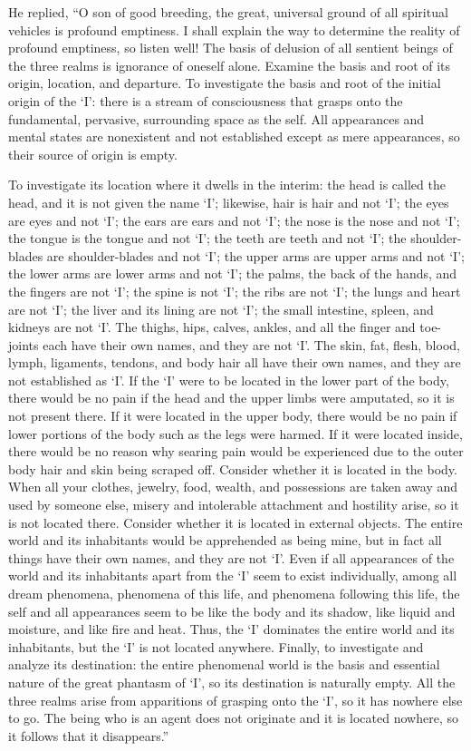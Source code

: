 \documentclass[a4paper,11pt,twoside,final]{book}
\begin{document}
He replied, ``O son of good breeding, the great, universal ground of
all spiritual vehicles is profound emptiness. I shall explain the way
to determine the reality of profound emptiness, so listen well! The
basis of delusion of all sentient beings of the three realms is
ignorance of oneself alone. Examine the basis and root of its origin,
location, and departure. To investigate the basis and root of the
initial origin of the `I': there is a stream of consciousness that
grasps onto the fundamental, pervasive, surrounding space as the
self. All appearances and mental states are nonexistent and not
established except as mere appearances, so their source of origin is
empty.

To investigate its location where it dwells in the interim: the head
is called the head, and it is not given the name `I'; likewise, hair
is hair and not `I'; the eyes are eyes and not `I'; the ears are ears
and not `I'; the nose is the nose and not `I'; the tongue is the
tongue and not `I'; the teeth are teeth and not `I'; the
shoulder-blades are shoulder-blades and not `I'; the upper arms are
upper arms and not `I'; the lower arms are lower arms and not `I'; the
palms, the back of the hands, and the fingers are not `I'; the spine
is not `I'; the ribs are not `I'; the lungs and heart are not `I'; the
liver and its lining are not `I'; the small intestine, spleen, and
kidneys are not `I'. The thighs, hips, calves, ankles, and all the
finger and toe-joints each have their own names, and they are not `I'.
The skin, fat, flesh, blood, lymph, ligaments, tendons, and body hair
all have their own names, and they are not established as `I'. If the
`I' were to be located in the lower part of the body, there would be
no pain if the head and the upper limbs were amputated, so it is not
present there. If it were located in the upper body, there would be no
pain if lower portions of the body such as the legs were harmed. If it
were located inside, there would be no reason why searing pain would
be experienced due to the outer body hair and skin being scraped
off. Consider whether it is located in the body. When all your
clothes, jewelry, food, wealth, and possessions are taken away and
used by someone else, misery and intolerable attachment and hostility
arise, so it is not located there. Consider whether it is located in
external objects. The entire world and its inhabitants would be
apprehended as being mine, but in fact all things have their own
names, and they are not `I'. Even if all appearances of the world and
its inhabitants apart from the `I' seem to exist individually, among
all dream phenomena, phenomena of this life, and phenomena following
this life, the self and all appearances seem to be like the body and
its shadow, like liquid and moisture, and like fire and heat. Thus,
the `I' dominates the entire world and its inhabitants, but the `I' is
not located anywhere.  Finally, to investigate and analyze its
destination: the entire phenomenal world is the basis and essential
nature of the great phantasm of `I', so its destination is naturally
empty. All the three realms arise from apparitions of grasping onto
the `I', so it has nowhere else to go. The being who is an agent does
not originate and it is located nowhere, so it follows that it
disappears.''
\end{document}
